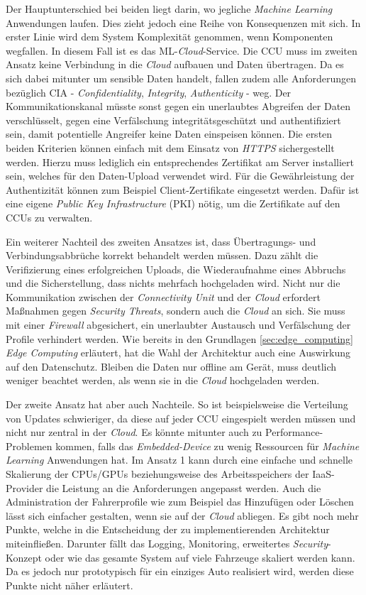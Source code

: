 Der Hauptunterschied bei beiden liegt darin, wo jegliche \textit{Machine Learning} Anwendungen laufen. Dies zieht jedoch eine Reihe von Konsequenzen mit sich. In erster Linie wird dem System Komplexität genommen, wenn Komponenten wegfallen. In diesem Fall ist es das ML-\textit{Cloud}-Service. Die CCU muss im zweiten Ansatz keine Verbindung in die \textit{Cloud} aufbauen und Daten übertragen. Da es sich dabei mitunter um sensible Daten handelt, fallen zudem alle Anforderungen bezüglich CIA - \textit{Confidentiality}, \textit{Integrity}, \textit{Authenticity} - weg. Der Kommunikationskanal müsste sonst gegen ein unerlaubtes Abgreifen der Daten verschlüsselt, gegen eine Verfälschung integritätsgeschützt und authentifiziert sein, damit potentielle Angreifer keine Daten einspeisen können. Die ersten beiden Kriterien können einfach mit dem Einsatz von \textit{HTTPS} sichergestellt werden. Hierzu muss lediglich ein entsprechendes Zertifikat am Server installiert sein, welches für den Daten-Upload verwendet wird. Für die Gewährleistung der Authentizität können zum Beispiel Client-Zertifikate eingesetzt werden. Dafür ist eine eigene \textit{Public Key Infrastructure} (PKI) nötig, um die Zertifikate auf den CCUs zu verwalten.

Ein weiterer Nachteil des zweiten Ansatzes ist, dass Übertragungs- und Verbindungsabbrüche korrekt behandelt werden müssen. Dazu zählt die Verifizierung eines erfolgreichen Uploads, die Wiederaufnahme eines Abbruchs und die Sicherstellung, dass nichts mehrfach hochgeladen wird. Nicht nur die Kommunikation zwischen der \textit{Connectivity Unit} und der \textit{Cloud} erfordert Maßnahmen gegen \textit{Security Threats}, sondern auch die \textit{Cloud} an sich. Sie muss mit einer \textit{Firewall} abgesichert, ein unerlaubter Austausch und Verfälschung der Profile verhindert werden. Wie bereits in den Grundlagen \ref{sec:edge_computing} \textit{Edge Computing} erläutert, hat die Wahl der Architektur auch eine Auswirkung auf den Datenschutz. Bleiben die Daten nur offline am Gerät, muss deutlich weniger beachtet werden, als wenn sie in die \textit{Cloud} hochgeladen werden.

Der zweite Ansatz hat aber auch Nachteile. So ist beispielsweise die Verteilung von Updates schwieriger, da diese auf jeder CCU eingespielt werden müssen und nicht nur zentral in der \textit{Cloud}. Es könnte mitunter auch zu Performance-Problemen kommen, falls das \textit{Embedded-Device} zu wenig Ressourcen für \textit{Machine Learning} Anwendungen hat. Im Ansatz 1 kann durch eine einfache und schnelle Skalierung der CPUs/GPUs beziehungsweise des Arbeitsspeichers der IaaS-Provider die Leistung an die Anforderungen angepasst werden. Auch die Administration der Fahrerprofile wie zum Beispiel das Hinzufügen oder Löschen lässt sich einfacher gestalten, wenn sie auf der \textit{Cloud} abliegen. Es gibt noch mehr Punkte, welche in die Entscheidung der zu implementierenden Architektur miteinfließen. Darunter fällt das Logging, Monitoring, erweitertes \textit{Security}-Konzept oder wie das gesamte System auf viele Fahrzeuge skaliert werden kann. Da es jedoch nur prototypisch für ein einziges Auto realisiert wird, werden diese Punkte nicht näher erläutert.

